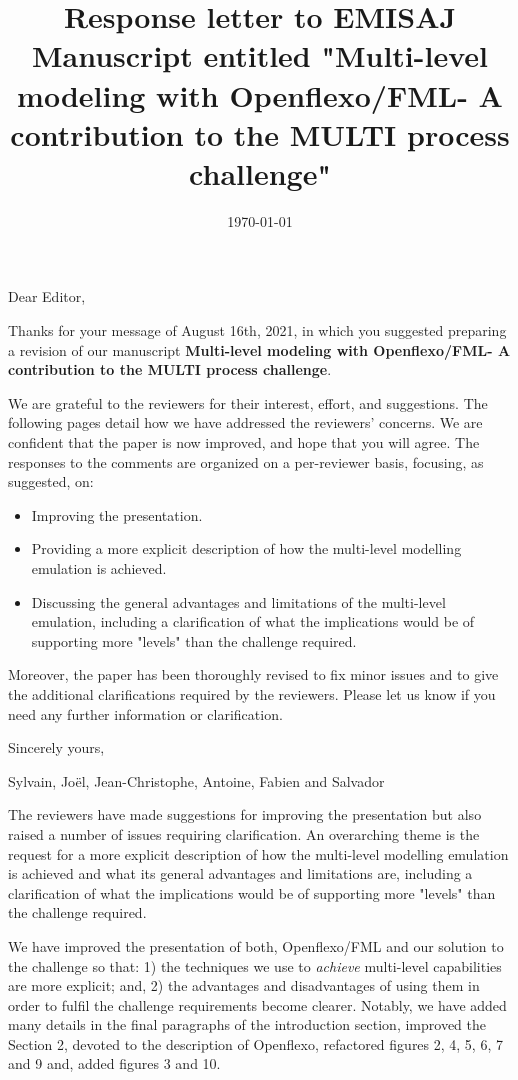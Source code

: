 \documentclass[10pt]{article}
\title{Response letter to EMISAJ Manuscript entitled "Multi-level modeling with Openflexo/FML- A contribution to the MULTI process challenge"}
\date{\today}
\begin{document}
Dear Editor,

\bigskip
Thanks for your message of August 16th, 2021, in which you suggested preparing a revision of our manuscript  \textbf{Multi-level modeling with Openflexo/FML- A contribution to the MULTI process challenge}.

\bigskip
We are grateful to the reviewers for their interest, effort, and suggestions. The  following pages detail how we have addressed the reviewers' concerns. We are confident that the paper is now improved, and hope that you will agree. The responses to the comments are organized on a per-reviewer basis, focusing, as suggested, on:

\begin{itemize}
\item Improving the presentation.
\item Providing a more explicit description of how the multi-level modelling emulation is achieved.
\item Discussing the general advantages and limitations of the multi-level emulation, including a clarification of what the implications would be of supporting more "levels" than the challenge required.
\end{itemize}

Moreover, the paper has been thoroughly revised to fix minor issues and to give the additional clarifications required by the reviewers. Please let us know if you need any further information or clarification.

\bigskip
Sincerely yours,

\bigskip
Sylvain, Joël, Jean-Christophe, Antoine, Fabien and Salvador

\pagebreak

\Editor{}

\begin{response}{The reviewers have made suggestions for improving the presentation but also raised a number of issues requiring clarification. An overarching theme is the request for a more explicit description of how the multi-level modelling emulation is achieved and what its general advantages and limitations are, including a clarification of what the implications would be of supporting more "levels" than the challenge required.}

We have improved the presentation of both, Openflexo/FML and our solution to the challenge so that: 1) the techniques we use to \emph{achieve} multi-level capabilities are more explicit; and, 2) the advantages and disadvantages of using them in order to fulfil the challenge requirements become clearer. Notably, we have added many details in the final paragraphs of the introduction section, improved the Section 2, devoted to the description of Openflexo, refactored figures 2, 4, 5, 6, 7 and 9 and, added figures 3 and 10.
\end{response}
\end{document}
